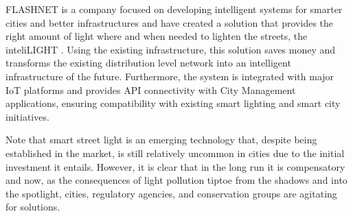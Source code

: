 FLASHNET is a company focused on developing intelligent systems for smarter cities and better infrastructures and have created a solution that provides the right amount of light where and when needed to lighten the streets, the inteliLIGHT \cite{inteli_light}. Using the existing infrastructure, this solution saves money and transforms the existing distribution level network into an intelligent infrastructure of the future. Furthermore, the system is integrated with major IoT platforms and provides API connectivity with City Management applications, ensuring compatibility with existing smart lighting and smart city initiatives.

Note that smart street light is an emerging technology that, despite being established in the market, is still relatively uncommon in cities due to the initial investment it entails. However, it is clear that in the long run it is compensatory and now, as the consequences of light pollution tiptoe from the shadows and into the spotlight, cities, regulatory agencies, and conservation groups are agitating for solutions.